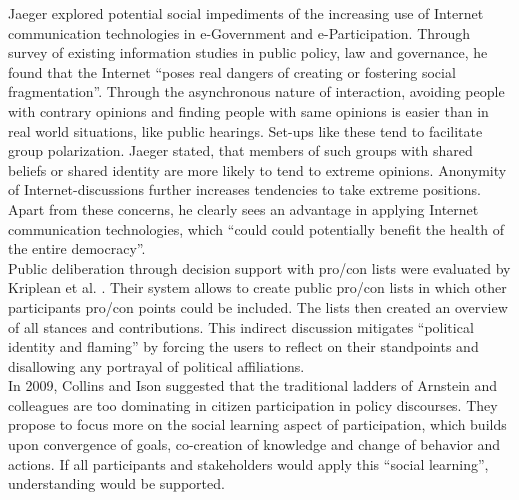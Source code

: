 Jaeger \cite{Jaeger2005_deliberate_democracy_and_egovernment} explored potential social impediments of the increasing use of Internet communication technologies in e-Government and e-Participation. Through survey of existing information studies in public policy, law and governance, he found that the Internet ``poses real dangers of creating or fostering social fragmentation''. Through the asynchronous nature of interaction, avoiding people with contrary opinions and finding people with same opinions is easier than in real world situations, like public hearings. Set-ups like these tend to facilitate group polarization. Jaeger stated, that members of such groups with shared beliefs or shared identity are more likely to tend to extreme opinions. Anonymity of Internet-discussions further increases tendencies to take extreme positions. Apart from these concerns, he clearly sees an advantage in applying Internet communication technologies, which ``could could potentially benefit the health of the entire democracy''.\\
Public deliberation through decision support with pro/con lists were evaluated by Kriplean et al. \cite{Kriplean2012_Considerit}. Their system allows to create public pro/con lists in which other participants pro/con points could be included. The lists then created an overview of all stances and contributions. This indirect discussion mitigates ``political identity and flaming'' by forcing the users to reflect on their standpoints and disallowing any portrayal of political affiliations.\\
In 2009, Collins and Ison \cite{Collins2009_social_learning} suggested that the traditional ladders of Arnstein and colleagues are too dominating in citizen participation in policy discourses. They propose to focus more on the social learning aspect of participation, which builds upon convergence of goals, co-creation of knowledge and change of behavior and actions. If all participants and stakeholders would apply this ``social learning'', understanding would be supported.%

